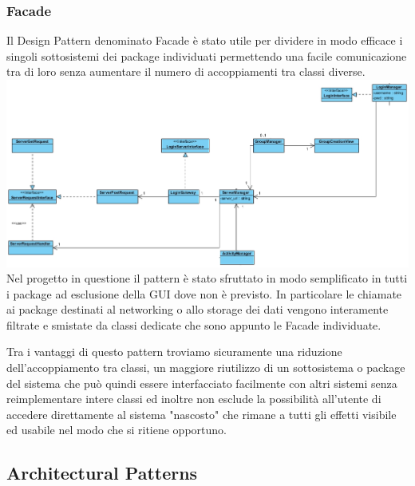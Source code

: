 \documentclass[12pt]{scrartcl}
\begin{document}
\subsubsection{Facade}
Il Design Pattern denominato Facade \`e stato utile per dividere
in modo efficace i singoli sottosistemi dei package individuati
permettendo una facile comunicazione tra di loro senza aumentare
il numero di accoppiamenti tra classi diverse.\\
    \includegraphics[scale=0.40]{1.png}
Nel progetto in questione il pattern \`e stato sfruttato in modo
semplificato in tutti i package ad esclusione della GUI dove
non \`e previsto. In particolare le chiamate ai package destinati
al networking o allo storage dei dati vengono interamente filtrate
e smistate da classi dedicate che sono appunto le Facade individuate.

Tra i vantaggi di questo pattern troviamo sicuramente una riduzione
dell'accoppiamento tra classi, un maggiore riutilizzo di un sottosistema
o package del sistema che pu\`o quindi essere interfacciato facilmente
con altri sistemi senza reimplementare intere classi ed inoltre non
esclude la possibilit\`a all'utente di accedere direttamente al
sistema "nascosto" che rimane a tutti gli effetti visibile ed
usabile nel modo che si ritiene opportuno.
\subsection{Architectural Patterns}
\end{document}
